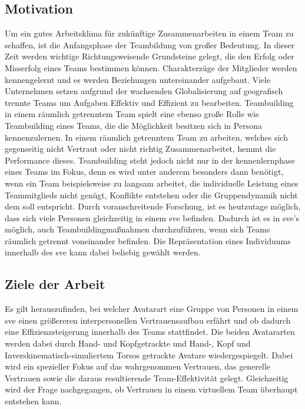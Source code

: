 \documentclass[a4paper,11pt]{article}%
\renewcommand{\\}{\vspace*{0.5\baselineskip} \newline}
\begin{document}
{		\subsection{Motivation}
	Um ein gutes Arbeitsklima für zukünftige Zusammenarbeiten in einem Team zu schaffen, ist die Anfangsphase der Teambildung von großer Bedeutung. In dieser Zeit werden wichtige Richtungsweisende Grundsteine gelegt, die den Erfolg oder Misserfolg eines Teams bestimmen können. Charakterzüge der Mitglieder werden kennengelernt und es werden Beziehungen untereinander aufgebaut. \\	
	Viele Unternehmen setzen aufgrund der wachsenden Globalisierung auf geografisch trennte Teams um Aufgaben Effektiv und Effizient zu bearbeiten. Teambuilding in einem räumlich getrenntem Team spielt eine ebenso große Rolle wie Teambuilding eines Teams, die die Möglichkeit besitzen sich in Persona kennenzulernen. \\
	In einem räumlich getrenntem Team zu arbeiten, welches sich gegenseitig nicht Vertraut oder nicht richtig Zusammenarbeitet, hemmt die Performance dieses. \citep[p. 98-107]{huang1998supporting} \citep[p. 399-417]{turoff1993distributed} \\	
	Teambuilding steht jedoch nicht nur in der kennenlernphase eines Teams im Fokus, denn es wird unter anderem besonders dann benötigt, wenn ein Team beispielsweise zu langsam arbeitet, die individuelle Leistung eines Teammitglieds nicht genügt, Konflikte entstehen oder die Gruppendynamik nicht dem soll entspricht. \citep[p. 1-3]{biech2007pfeiffer}\\
	Durch voranschreitende Forschung, ist es heutzutage möglich, dass sich viele Personen gleichzeitig in einem \glqq \ac{sve} \grqq befinden. Dadurch ist es in \ac{sve}'s möglich, auch Teambuildingmaßnahmen durchzuführen, wenn sich Teams räumlich getrennt voneinander befinden.\\
	Die Repräsentation eines Individuums innerhalb des \ac{sve} kann dabei beliebig gewählt werden.
	
		\subsection{Ziele der Arbeit}
		Es gilt herauszufinden, bei welcher Avatarart eine Gruppe von Personen in einem \ac{sve} einen größereren interpersonellen Vertrauensaufbau erfährt und ob dadurch eine Effizienzsteigerung innerhalb des Teams stattfindet. Die beiden Avatararten werden dabei durch Hand- und Kopfgetrackte und Hand-, Kopf und Inverskinematisch-simuliertem Torsos getrackte Avatare wiedergespiegelt. Dabei wird ein spezieller Fokus auf das wahrgenommen Vertrauen, das generelle Vertrauen sowie die daraus resultierende Team-Effektivität gelegt.
Gleichzeitig wird der Frage nachgegangen, ob Vertrauen in einem virtuellem Team überhaupt entstehen kann.

}
\end{document}
